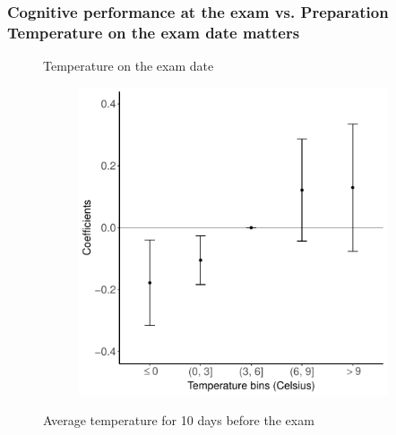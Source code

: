 \documentclass[10pt, pdfmx,hiresbb]{beamer}
\begin{document}
\begin{frame}\frametitle{Cognitive performance at the exam vs. Preparation \\ {\small Temperature on the exam date matters}}
  \begin{figure}
    \center
    \begin{minipage}{0.43\textwidth}
      \begin{center}
        Temperature on the exam date \smallskip
      \end{center}
      \begin{figure}[h]
        \centering
        \includegraphics[width = \textwidth]{../Output/images/reg_pre10_exam_4.pdf}
      \end{figure}
    \end{minipage}
    \begin{minipage}{0.43\textwidth}
      \begin{center}
        Average temperature for 10 days before the exam
      \end{center}
      \begin{figure}[h]

\end{figure}
\end{minipage}
\end{figure}
\end{frame}
\end{document}
